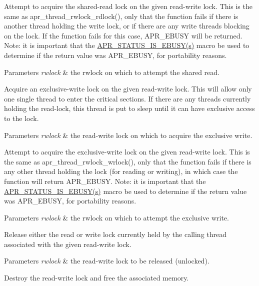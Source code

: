 Attempt to acquire the shared-\/read lock on the given read-\/write lock. This is the same as apr\+\_\+thread\+\_\+rwlock\+\_\+rdlock(), only that the function fails if there is another thread holding the write lock, or if there are any write threads blocking on the lock. If the function fails for this case, A\+P\+R\+\_\+\+E\+B\+U\+SY will be returned. Note\+: it is important that the \hyperlink{group__APR__STATUS__IS_gabb92ad7b6ef304132de70e9e5cbaa896}{A\+P\+R\+\_\+\+S\+T\+A\+T\+U\+S\+\_\+\+I\+S\+\_\+\+E\+B\+U\+S\+Y(s)} macro be used to determine if the return value was A\+P\+R\+\_\+\+E\+B\+U\+SY, for portability reasons. 
\begin{DoxyParams}{Parameters}
{\em rwlock} & the rwlock on which to attempt the shared read.\\
\hline
\end{DoxyParams}
Acquire an exclusive-\/write lock on the given read-\/write lock. This will allow only one single thread to enter the critical sections. If there are any threads currently holding the read-\/lock, this thread is put to sleep until it can have exclusive access to the lock. 
\begin{DoxyParams}{Parameters}
{\em rwlock} & the read-\/write lock on which to acquire the exclusive write.\\
\hline
\end{DoxyParams}
Attempt to acquire the exclusive-\/write lock on the given read-\/write lock. This is the same as apr\+\_\+thread\+\_\+rwlock\+\_\+wrlock(), only that the function fails if there is any other thread holding the lock (for reading or writing), in which case the function will return A\+P\+R\+\_\+\+E\+B\+U\+SY. Note\+: it is important that the \hyperlink{group__APR__STATUS__IS_gabb92ad7b6ef304132de70e9e5cbaa896}{A\+P\+R\+\_\+\+S\+T\+A\+T\+U\+S\+\_\+\+I\+S\+\_\+\+E\+B\+U\+S\+Y(s)} macro be used to determine if the return value was A\+P\+R\+\_\+\+E\+B\+U\+SY, for portability reasons. 
\begin{DoxyParams}{Parameters}
{\em rwlock} & the rwlock on which to attempt the exclusive write.\\
\hline
\end{DoxyParams}
Release either the read or write lock currently held by the calling thread associated with the given read-\/write lock. 
\begin{DoxyParams}{Parameters}
{\em rwlock} & the read-\/write lock to be released (unlocked).\\
\hline
\end{DoxyParams}
Destroy the read-\/write lock and free the associated memory. 

